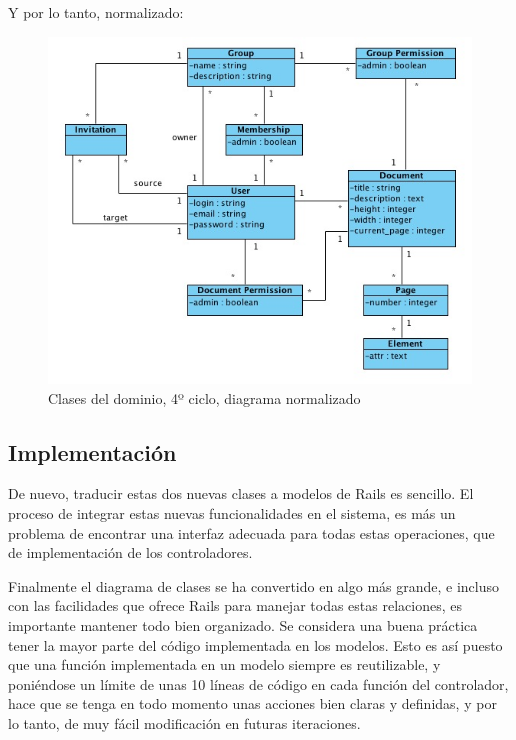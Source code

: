 Y por lo tanto, normalizado:

\begin{figure}[h!]
\centering
\includegraphics[width=14cm]{uml4n.png}
\caption{Clases del dominio, 4º ciclo, diagrama normalizado}\label{fig:uml4n}
\end{figure}


\subsection{Implementación} %
\label{sub:implementación}

De nuevo, traducir estas dos nuevas clases a modelos de Rails es sencillo. El proceso de integrar estas nuevas funcionalidades en el sistema, es más un problema de encontrar una interfaz adecuada para todas estas operaciones, que de implementación de los controladores.

Finalmente el diagrama de clases se ha convertido en algo más grande, e incluso con las facilidades que ofrece Rails para manejar todas estas relaciones, es importante mantener todo bien organizado. Se considera una buena práctica tener la mayor parte del código implementada en los modelos. Esto es así puesto que una función implementada en un modelo siempre es reutilizable, y poniéndose un límite de unas 10 líneas de código en cada función del controlador, hace que se tenga en todo momento unas acciones bien claras y definidas, y por lo tanto, de muy fácil modificación en futuras iteraciones.

